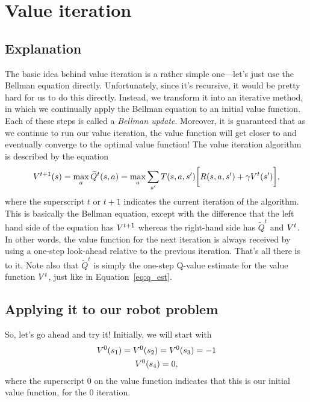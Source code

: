 \documentclass[a4paper]{article}
\begin{document}
\section{Value iteration}
\subsection{Explanation}
The basic idea behind value iteration is a rather simple one---let's just use
the Bellman equation directly.
Unfortunately, since it's recursive, it would be pretty hard for us to do
this directly.
Instead, we transform it into an iterative method, in which we continually
apply the Bellman equation to an initial value function.
Each of these steps is called a \emph{Bellman update}.
Moreover, it is guaranteed that as we continue to run our value iteration,
the value function will get closer to and eventually converge to the
optimal value function!
The value iteration algorithm is described by the equation
\begin{equation} \label{eq:val_it}
  V^{t+1}(s) = \operatorname*{max}_a \widetilde{Q}^t(s, a) = \operatorname*{max}_a \sum_{s'} T(s, a, s') \bigg[ R(s, a, s') + \gamma V^t(s') \bigg] ,
\end{equation}
where the superscript $t$ or $t+1$ indicates the current iteration of the
algorithm.
This is basically the Bellman equation, except with the difference that the
left hand side of the equation has $V^{t+1}$ whereas the right-hand side
has $\widetilde{Q}^t$ and $V^t$.
In other words, the value function for the next iteration is always received
by using a one-step look-ahead relative to the previous iteration.
That's all there is to it.
Note also that $\widetilde{Q}^t$ is simply the one-step Q-value estimate
for the value function $V^t$, just like in Equation~\ref{eq:q_est}.

\subsection{Applying it to our robot problem}
So, let's go ahead and try it!
Initially, we will start with
\begin{gather*}
  V^0(s_1) = V^0(s_2) = V^0(s_3) = -1 \\
  V^0(s_4) = 0 ,
\end{gather*}
where the superscript 0 on the value function indicates that this is
our initial value function, for the 0 iteration.
\end{document}
